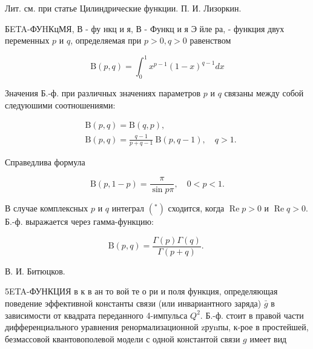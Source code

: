 \documentclass[10pt]{article}
\begin{document}
Лит. см. при статье Цилиндрические функции. П. И. Лизоркин.



БETA-ФУHКцМЯ, В - фу нкц и я, В - Функц и я $Э$ йле ра, - функция двух переменных $p$ и $q$, определяемая при $p>0, q>0$ равенством



\[

\mathrm{B}(p, q)=\int_{0}^{1} x^{p-1}(1-x)^{q-1} d x

\]



Значения Б.-ф. при различных значениях параметров $p$ и $q$ связаны между собой следуюшими соотношениями:



\[

\begin{aligned}

& \mathrm{B}(p, q)=\mathrm{B}(q, p), \\

& \mathrm{B}(p, q)=\frac{q-1}{p+q-1} \mathrm{~B}(p, q-1), \quad q>1 .

\end{aligned}

\]



Справедлива формула



\[

\mathrm{B}(p, 1-p)=\frac{\pi}{\sin p \pi}, \quad 0<p<1 .

\]



В случае комплексных $p$ и $q$ интеграл $\left({ }^{*}\right)$ сходится, когда $\operatorname{Re} p>0$ и $\operatorname{Re} q>0$. Б.-ф. выражается через гамма-функцию:



\[

\mathrm{B}(p, q)=\frac{\Gamma(p) \Gamma(q)}{\Gamma(p+q)} \text {. }

\]



В. И. Битюцков.



5ETA-ФУНКЦИЯ в к в ан то вой те о ри и поля функция, определяющая поведение эффективной константы связи (или инвариантного заряда) $\bar{g}$ в зависимости от квадрата переданного 4-импульса $Q^{2}$. Б.-ф. стоит в правой части дифференциального уравнения ренормализационной zруnпы, к-рое в простейшей, безмассовой квантовополевой модели с одной константой связи $g$ имеет вид
\end{document}
